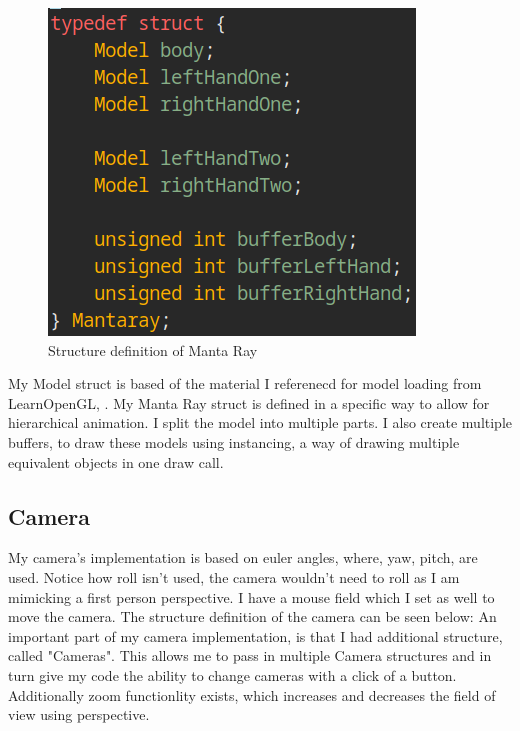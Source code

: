 \documentclass[a4paper, 10pt]{article}
\begin{document}
\newpage

\begin{figure}[h]
    \centering
    \includegraphics[scale=1.0]{images/mantaray-struct}
    \caption{Structure definition of Manta Ray}
    \label{fig:mantaray-struct}
\end{figure}

My Model struct is based of the material I referenecd for model loading from LearnOpenGL, \cite{learnopengl}.
My Manta Ray struct is defined in a specific way to allow for hierarchical animation. I split the model into multiple parts.
I also create multiple buffers, to draw these models using instancing, a way of drawing multiple equivalent objects in one
draw call. 

\subsection{Camera}
My camera's implementation is based on euler angles, where, yaw, pitch, are used. Notice how roll isn't used, the camera wouldn't
need to roll as I am mimicking a first person perspective. I have a mouse field which I set as well to move the camera.
The structure definition of the camera can be seen below:
An important part of my camera implementation, is that I had additional structure, called "Cameras". This allows me to pass in multiple
Camera structures and in turn give my code the ability to change cameras with a click of a button. Additionally zoom functionlity exists,
which increases and decreases the field of view using perspective. 
\end{document}

